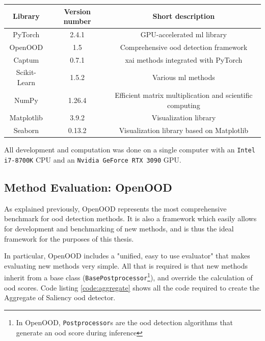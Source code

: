 \documentclass[UKenglish]{uiomasterthesis} %
\theoremstyle{definition}
\begin{document}
\begin{center}
    \begin{tabular}{ |c|c|c| } 
    \hline
    Library & Version number & Short description \\
    \hline
    PyTorch & 2.4.1 & GPU-accelerated \ac{ml} library \\ 
    OpenOOD & 1.5 & Comprehensive \ac{ood} detection framework \cite{openood} \\ 
    Captum & 0.7.1 & \ac{xai} methods integrated with PyTorch \\ 
    Scikit-Learn & 1.5.2 & Various \ac{ml} methods \\ 
    NumPy & 1.26.4 & Efficient matrix multiplication and scientific computing \\ 
    Matplotlib & 3.9.2  & Visualization library \\ 
    Seaborn & 0.13.2 & Visualization library based on Matplotlib \\
    \hline
    \end{tabular}
\end{center}

All development and computation was done on a single computer with an \texttt{Intel i7-8700K} CPU and an \texttt{Nvidia GeForce RTX 3090} GPU.

\subsection{Method Evaluation: OpenOOD}

As explained previously, OpenOOD \cite{openood} represents the most comprehensive benchmark for \ac{ood} detection methods. It is also a framework which easily allows for development and benchmarking of new methods, and is thus the ideal framework for the purposes of this thesis.

In particular, OpenOOD includes a "unified, easy to use evaluator" \cite{openood15} that makes evaluating new methods very simple. All that is required is that new methods inherit from a base class (\texttt{BasePostprocessor}\footnote{In OpenOOD, \texttt{Postprocessor}s are the \ac{ood} detection algorithms that generate an \ac{ood} score during inference}), and override the calculation of \ac{ood} scores. Code listing \ref{code:aggregate} shows all the code required to create the Aggregate of Saliency \ac{ood} detector.
\end{document}
